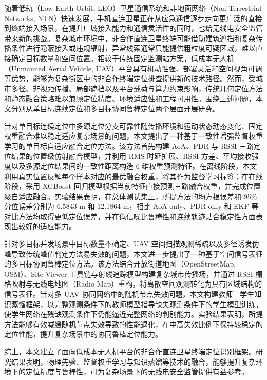 \begin{cnabstract}
随着低轨（Low Earth Orbit, LEO）卫星通信系统和非地面网络（Non-Terrestrial Networks, NTN）快速发展，手机直连卫星正在从应急通信逐步走向更广泛的直接到终端接入场景，在提升广域接入能力和通信灵活性的同时，也给无线电安全监管带来新的挑战。复杂城市环境中，非合作直连卫星终端可能借助建筑遮挡和复杂传播条件进行隐蔽接入或违规辐射，异常线索通常只能提供粗粒度可疑区域，难以直接确定目标数量和空间位置。相较于传统固定监测站方案，低成本无人机（Unmanned Aerial Vehicle, UAV）平台具有机动性强、部署灵活和空间视角可调等优势，能够为复杂街区中的非合作终端定位排查提供新的技术路径。然而，受城市多径、非视距传播、局部遮挡以及平台载荷与算力约束影响，传统几何定位方法和静态融合策略难以兼顾定位精度、环境适应性和工程可用性。围绕上述问题，本文分别从单目标连续定位和多目标协同鲁棒定位两个层面开展研究。

针对单目标连续定位中多源定位分支可靠性随传播环境和运动状态动态变化、固定权重融合难以稳定适应复杂场景的问题，本文提出了一种基于一致性增强监督权重学习的单目标自适应融合定位方法。该方法首先构建 AoA、PDR 与 RSSI 三路定位结果的位置级仿射融合模型，并利用 RMS 时延扩展、RSSI 方差、平均接收强度以及多源定位结果间的一致性距离构造 6 维权重预测特征。在离线阶段，本文利用真实位置反解每个样本对应的最优融合权重，将其作为监督学习标签；在在线阶段，采用 XGBoost 回归模型根据当前特征直接预测三路融合权重，并完成位置级自适应融合。实验结果表明，在总体测试集上，所提方法的均方根误差和 95\% 分位误差分别为 6.5843 m 和 12.1864 m，相比 AoA-only、PDR-only 和 EKF 等对比方法均取得更低定位误差，并在低信噪比鲁棒性和连续轨迹贴合稳定性方面表现出较好的适应能力。

针对多目标并发场景中目标数量不确定、UAV 空间扫描观测稀疏以及多径诱发伪峰导致传统峰值判定方法易失效的问题，本文进一步提出了一种基于空间信号表征的多目标协同鲁棒定位方法。该方法结合开放街道地图（OpenStreetMap, OSM）、Site Viewer 工具链与射线追踪模型构建复杂城市传播场，并通过 RSSI 栅格映射与无线电地图（Radio Map）重构，将离散空间观测转化为具有区域结构的信号表征。针对多 UAV 协同网络中的随机节点失效问题，本文构建教师—学生知识蒸馏框架，以完整观测条件下的教师模型指导缺失观测条件下的学生模型训练，使学生网络在残缺观测条件下仍能逼近完整网络的判别能力。实验结果表明，所提方法能够有效减缓随机节点失效导致的性能退化，在中高失效比例下保持较稳定的定位性能，提升复杂场景中的协同鲁棒定位能力。

综上，本文建立了面向低成本无人机平台的非合作直连卫星终端定位识别框架。研究结果表明，物理先验、监督权重学习与知识蒸馏等技术的融合，能够提升复杂环境下的定位精度与鲁棒性，可为复杂场景下的无线电安全监管提供有益参考。

\end{cnabstract}
